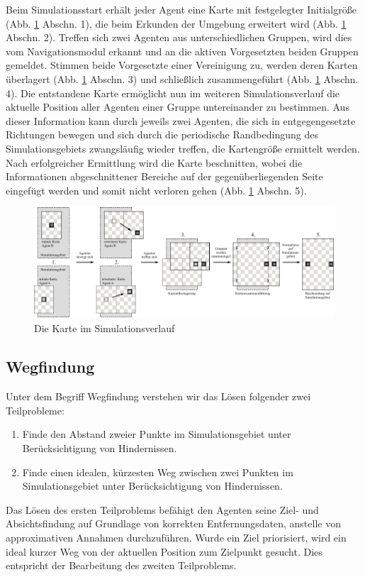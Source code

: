 \documentclass[runningheads]{llncs}
\begin{document}
Beim Simulationsstart erhält jeder Agent eine Karte mit festgelegter Initialgröße (Abb. \ref{Karte} Abschn. 1), die beim Erkunden der Umgebung erweitert wird (Abb. \ref{Karte} Abschn. 2). Treffen sich zwei Agenten aus unterschiedlichen Gruppen, wird dies vom Navigationsmodul erkannt und an die aktiven Vorgesetzten beiden Gruppen gemeldet. Stimmen beide Vorgesetzte einer Vereinigung zu, werden deren Karten überlagert (Abb. \ref{Karte} Abschn. 3) und schließlich zusammengeführt (Abb. \ref{Karte} Abschn. 4). Die entstandene Karte ermöglicht nun im weiteren Simulationsverlauf die aktuelle Position aller Agenten einer Gruppe untereinander zu bestimmen. Aus dieser Information kann durch jeweils zwei Agenten, die sich in entgegengesetzte Richtungen bewegen und sich durch die periodische Randbedingung \cite{Bungartz2013} des Simulationsgebiets zwangsläufig wieder treffen, die Kartengröße ermittelt werden. Nach erfolgreicher Ermittlung wird die Karte beschnitten, wobei die Informationen abgeschnittener Bereiche auf der gegenüberliegenden Seite eingefügt werden und somit nicht verloren gehen (Abb. \ref{Karte} Abschn. 5).
\begin{figure}[h]
\includegraphics[scale=0.8]{./Referenzen/Kartenmerge.pdf}
\caption{Die Karte im Simulationsverlauf}
\label{Karte}
\end{figure}

\subsection{Wegfindung}\label{wegfindung}
Unter dem Begriff Wegfindung verstehen wir das Lösen folgender zwei Teilprobleme:
\begin{enumerate}
\item Finde den Abstand zweier Punkte im Simulationsgebiet unter Berücksichtigung von Hindernissen.
\item Finde einen idealen, kürzesten Weg zwischen zwei Punkten im Simulationsgebiet unter Berücksichtigung von Hindernissen.
\end{enumerate}
Das Lösen des ersten Teilproblems befähigt den Agenten seine Ziel- und Absichtsfindung auf Grundlage von korrekten Entfernungsdaten, anstelle von approximativen Annahmen durchzuführen.
Wurde ein Ziel priorisiert, wird ein ideal kurzer Weg von der aktuellen Position zum Zielpunkt gesucht. Dies entspricht der Bearbeitung des zweiten Teilproblems.
\end{document}
